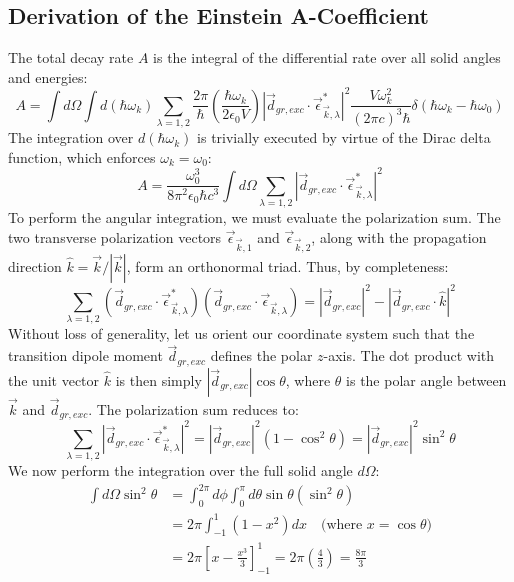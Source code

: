 \subsection{Derivation of the Einstein A-Coefficient~\cite{Einstein1916Rad}}
The total decay rate $A$ is the integral of the differential rate over all solid angles and energies:
\begin{equation}
    A = \int d\Omega \int d(\hbar \omega_k) \sum_{\lambda=1,2} \frac{2\pi}{\hbar} \left( \frac{\hbar \omega_k}{2 \epsilon_0 V} \right) |\vec{d}_{gr, exc} \cdot \vec{\epsilon}_{\vec{k}, \lambda}^*|^2 \frac{V \omega_k^2}{(2\pi c)^3 \hbar} \delta(\hbar \omega_k - \hbar \omega_0)
\end{equation}
The integration over $d(\hbar \omega_k)$ is trivially executed by virtue of the Dirac delta function, which enforces $\omega_k = \omega_0$:
\begin{equation}
    A = \frac{\omega_0^3}{8 \pi^2 \epsilon_0 \hbar c^3} \int d\Omega \sum_{\lambda=1,2} |\vec{d}_{gr, exc} \cdot \vec{\epsilon}_{\vec{k}, \lambda}^*|^2
\end{equation}
To perform the angular integration, we must evaluate the polarization sum. The two transverse polarization vectors $\vec{\epsilon}_{\vec{k}, 1}$ and $\vec{\epsilon}_{\vec{k}, 2}$, along with the propagation direction $\hat{k} = \vec{k}/|\vec{k}|$, form an orthonormal triad. Thus, by completeness:
\begin{equation}
    \sum_{\lambda=1,2} (\vec{d}_{gr, exc} \cdot \vec{\epsilon}_{\vec{k}, \lambda}^*)(\vec{d}_{gr, exc} \cdot \vec{\epsilon}_{\vec{k}, \lambda}) = |\vec{d}_{gr, exc}|^2 - |\vec{d}_{gr, exc} \cdot \hat{k}|^2
\end{equation}
Without loss of generality, let us orient our coordinate system such that the transition dipole moment $\vec{d}_{gr, exc}$ defines the polar $z$-axis. The dot product with the unit vector $\hat{k}$ is then simply $|\vec{d}_{gr, exc}|\cos\theta$, where $\theta$ is the polar angle between $\vec{k}$ and $\vec{d}_{gr, exc}$. The polarization sum reduces to:
\begin{equation}
    \sum_{\lambda=1,2} |\vec{d}_{gr, exc} \cdot \vec{\epsilon}_{\vec{k}, \lambda}^*|^2 = |\vec{d}_{gr, exc}|^2 (1 - \cos^2\theta) = |\vec{d}_{gr, exc}|^2 \sin^2\theta
\end{equation}
We now perform the integration over the full solid angle $d\Omega$:
\begin{align}
    \int d\Omega \sin^2\theta &= \int_0^{2\pi} d\phi \int_0^\pi d\theta \sin\theta (\sin^2\theta) \nonumber \\
    &= 2\pi \int_{-1}^1 (1 - x^2) dx \quad \text{(where } x = \cos\theta \text{)} \nonumber \\
    &= 2\pi \left[ x - \frac{x^3}{3} \right]_{-1}^1 = 2\pi \left( \frac{4}{3} \right) = \frac{8\pi}{3}
\end{align}
